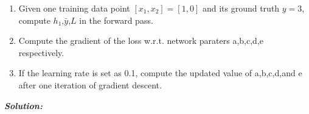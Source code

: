\documentclass[addpoints,12pt]{exam}
\begin{document}
\begin{questions}
\begin{enumerate}[label=(\alph*)]
    \item Given one training data point $[x_1,x_2 ]=[1,0]$ and its ground truth $y=3$, compute $h_1$,$\bar{y}$,$L$ in the forward pass.
    \item Compute the gradient of the loss w.r.t. network paraters a,b,c,d,e respectively.
    \item If the learning rate is set as 0.1, compute the updated value of a,b,c,d,and e after one iteration of gradient descent.
\end{enumerate}

\textbf{\textit{{\color{coral} Solution:}}}


\end{questions}
\end{document}
